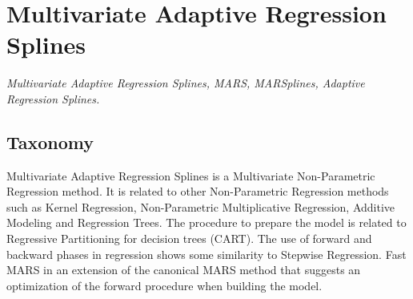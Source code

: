

\section{Multivariate Adaptive Regression Splines} 
\label{sec:mars}

\emph{Multivariate Adaptive Regression Splines, MARS, MARSplines, Adaptive Regression Splines.}

\subsection{Taxonomy}
Multivariate Adaptive Regression Splines is a Multivariate Non-Parametric Regression method.
It is related to other Non-Parametric Regression methods such as Kernel Regression, Non-Parametric Multiplicative Regression, Additive Modeling and Regression Trees. The procedure to prepare the model is related to Regressive Partitioning for decision trees (CART). The use of forward and backward phases in regression shows some similarity to Stepwise Regression.
Fast MARS in an extension of the canonical MARS method that suggests an optimization of the forward procedure when building the model.

